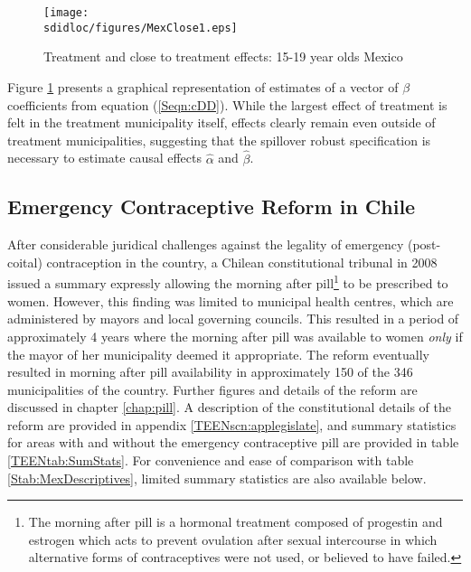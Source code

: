 \begin{figure}[h!]
\texttt{[image: \\sdidloc/figures/MexClose1.eps]}
\caption{Treatment and close to treatment effects: 15-19 year olds Mexico}
\label{SFig:MexClose}
\vspace{2mm}
\end{figure}
Figure \ref{SFig:MexClose} presents a graphical representation of estimates
of a vector of $\beta$ coefficients from equation (\ref{Seqn:cDD}). While the 
largest effect of treatment is felt in the treatment municipality itself, effects 
clearly remain even outside of treatment municipalities, suggesting that the 
spillover robust specification is necessary to estimate causal effects 
$\hat\alpha$ and $\hat\beta$.

\subsection{Emergency Contraceptive Reform in Chile}
After considerable juridical challenges against the legality of emergency 
(post-coital) contraception in the country, a Chilean constitutional tribunal in 
2008 issued a summary expressly allowing the morning after pill\footnote{The 
morning after pill is a hormonal treatment composed of progestin and estrogen 
which acts to prevent ovulation after sexual intercourse in which alternative 
forms of contraceptives were not used, or believed to have failed.} to be 
prescribed to women.  However, this finding was limited to municipal health 
centres, which are administered by mayors and local governing councils.  This
resulted in a period of approximately 4 years where the morning after pill was 
available to women \emph{only} if the mayor of her municipality deemed it 
appropriate.  The reform eventually resulted in morning after pill availability in 
approximately 150 of the 346 municipalities of the country.  Further figures and 
details of the reform are discussed in chapter \ref{chap:pill}.  A description
of the constitutional details of the reform are provided in appendix 
\ref{TEENscn:applegislate}, and summary statistics for areas with and without
the emergency contraceptive pill are provided in table \ref{TEENtab:SumStats}.
For convenience and ease of comparison with table \ref{Stab:MexDescriptives}, 
limited summary statistics are also available below.

